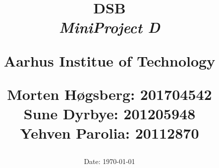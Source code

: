 \newcommand{\authorName}{}
\newcommand{\titleName}{DSB}
\newcommand{\subject}{MiniProject D}
\newcommand{\institute}{Aarhus Institue of Technology}
\begin{titlepage}
  \centering
    \title
    {
      \Huge \textbf{\titleName}\\
      \scale{\numberSQRTTWO}{\vspace{\sol pt}}
      \LARGE \textit{\subject}
      \scale{\numberSQRTTWO}{\rule{\linewidth}{\sol pt}}

      \textbf{\institute}
      
      \LARGE Morten Høgsberg: 201704542 \\ \LARGE Sune Dyrbye: 201205948 \\ \LARGE Yehven Parolia: 20112870
      \date{\LARGE Date: \today}
    }
\end{titlepage}

